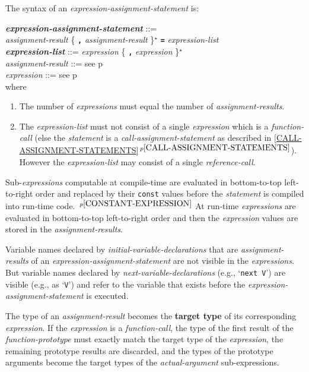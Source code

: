 \documentclass[12pt]{article}
\newcommand{\TT}[1]{{\tt \bfseries #1}}
\newcommand{\STAR}{{\Large $^\star$}}
\newcommand{\key}[1]{{\rm \bfseries #1}}
\newcommand{\emkey}[1]{{\em \bfseries #1}}
\newcommand{\itemref}[1]{\ref{#1}$\,^{p\pageref{#1}}$}
\newcommand{\pagref}[1]{p\pageref{#1}}
\newcommand{\pagnote}[1]{$\,^{p\pageref{#1}}$}
\newenvironment{indpar}[1][0.3in]%
	{\begin{list}{}%
		     {\setlength{\itemsep}{0in}%
		      \setlength{\topsep}{0in}%
		      \setlength{\parsep}{1ex}%
		      \setlength{\labelwidth}{#1}%
		      \setlength{\leftmargin}{#1}%
		      \addtolength{\leftmargin}{\labelsep}}%
	 \item}%
	{\end{list}}
\begin{document}
The syntax of an {\em expression-assign\-ment-statement} is:
\begin{indpar}
\emkey{expression-assignment-statement} ::= \\
\hspace*{0.5in} {\em assignment-result}
                \{ \TT{,} {\em assignment-result} \}\STAR{}
		\TT{=} {\em expression-list}
\\[0.5ex]
\emkey{expression-list}\label{EXPRESSION-LIST} ::=
	      {\em expression} \{ \TT{,} {\em expression} \}\STAR{}
\\[0.5ex]
{\em assignment-result} ::= see \pagref{ASSIGNMENT-RESULT}
\\[0.5ex]
{\em expression} ::= see \pagref{EXPRESSION}
\\[2.0ex]
where
\begin{enumerate}

\item The number of {\em expressions} must equal the number
of {\em assignment-results}.

\item The {\em expression-list} must not consist of a single
{\em expression} which is a {\em function-call} (else the
{\em statement} is a {\em call-assignment-statement} as described in
\itemref{CALL-ASSIGNMENT-STATEMENTS}).  However the {\em expression-list}
may consist of a single {\em reference-call}.

\end{enumerate}
\end{indpar}

Sub-{\em expressions} computable at compile-time are evaluated
in bottom-to-top left-to-right order and replaced by their {\tt const} values
before the {\em statement} is compiled into run-time code.%
\pagnote{CONSTANT-EXPRESSION}
At run-time {\em expressions} are evaluated in bottom-to-top
left-to-right order and
then the {\em expression} values are stored in the {\em assignment-results}.

Variable names declared by {\em initial-variable-declarations} that are
{\em assignment-results} of an {\em expression-assignment-statement}
are not visible in the {\em expressions}.
But variable names declared by {\em next-variable-declarations}
(e.g., `{\tt next V}') are visible (e.g., as `{\tt V}')
and refer to the variable
that exists before the {\em expression-assignment-statement} is
executed.

The type of an {\em assignment-result} becomes the \key{target type}
of its corresponding {\em expression}.  If the {\em expression}
is a {\em function-call}, the type of the first result of the
{\em function-prototype} must exactly match
the target type of the {\em expression}, the remaining prototype
results are discarded,
and the types of the prototype arguments become the target types
of the {\em actual-argument} sub-expressions.
\end{document}
